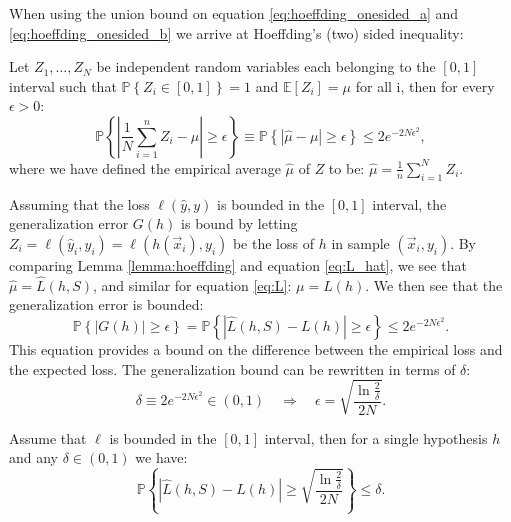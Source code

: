 When using the union bound on equation \eqref{eq:hoeffding_onesided_a} and \eqref{eq:hoeffding_onesided_b} we arrive at Hoeffding's (two) sided inequality:
\begin{lemma}
  \label{lemma:hoeffding}
  Let $Z_1, \dots, Z_N$ be independent random variables each belonging to the $[0, 1]$ interval such that $\mathbb{P}\left\{Z_i \in [0, 1] \right\} = 1$ and $\mathbb{E}[Z_i] = \mu$ for all i, then for every $\epsilon > 0$:
  \begin{equation}
    \mathbb{P} \left\{ \left| \frac{1}{N}\sum_{i=1}^n Z_i - \mu \right| \geq \epsilon \right\} \equiv \mathbb{P} \left\{ \left| \hat{\mu} - \mu \right| \geq \epsilon \right\} \leq 2 e^{-2N\epsilon^2},
    \label{eq:hoeffding_inequality}
  \end{equation}
  where we have defined the empirical average $\hat{\mu}$ of $Z$ to be: $\hat{\mu}=\frac{1}{n}\sum_{i=1}^N Z_i$.
\end{lemma}
Assuming that the loss $\ell(\hat{y}, y)$ is bounded in the $[0, 1]$ interval, the generalization error $G(h)$ is bound by letting $Z_i = \ell(\hat{y}_i, y_i) = \ell(h(\vec{x}_i), y_i)$ be the loss of $h$ in sample $(\vec{x}_i, y_i)$. By comparing Lemma \ref{lemma:hoeffding} and equation \eqref{eq:L_hat}, we see that $\hat{\mu} = \hat{L}(h, S)$, and similar for equation \eqref{eq:L}: $\mu = L(h)$. We then see that the generalization error is bounded:
\begin{equation}
  \label{eq:hoeffding_inequality_generalization_error}
  \mathbb{P} \left\{ \left| G(h) \right| \geq \epsilon \right\} = \mathbb{P} \left\{ \left| \hat{L}(h, S) - L(h) \right| \geq \epsilon \right\} \leq 2 e^{-2N\epsilon^2}.
\end{equation}
This equation provides a bound on the difference between the empirical loss and the expected loss. 
The generalization bound  can be rewritten in terms of $\delta$:
\begin{equation}
  \delta \equiv 2 e^{-2N\epsilon^2} \in (0, 1) \quad \Rightarrow \quad \epsilon = \sqrt{\frac{\ln \frac{2}{\delta}}{2N}}.
\end{equation}
\begin{theorem}
  \label{theorem:hoeffding_single}
  Assume that $\ell$ is bounded in the $[0, 1]$ interval, then for a single hypothesis $h$ and any $\delta\in(0,1)$ we have:  
  \begin{equation}
    \label{eq:hoeffding_inequality_generalization_error_delta}
    \mathbb{P} \left\{ \left| \hat{L}(h, S) - L(h) \right| \geq \sqrt{\frac{\ln \frac{2}{\delta}}{2N}}  \right\} \leq \delta.
  \end{equation}
\end{theorem}
